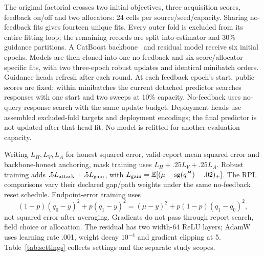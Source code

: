 \documentclass[11pt]{article}
\begin{document}
The original factorial crosses two initial objectives, three acquisition
scores, feedback on/off and two allocators: 24 cells per source/seed/capacity.
Sharing no-feedback fits gives fourteen unique fits. Every outer fold is
excluded from its entire fitting loop; the remaining records are split into
estimator and 30\% guidance partitions. A CatBoost backbone~\cite{catboost}
and residual model receive six initial epochs. Models are then cloned into
one no-feedback and six score/allocator-specific fits, with two three-epoch
robust updates and identical minibatch orders. Guidance heads refresh after
each round. At each feedback epoch's start, public scores are fixed; within
minibatches the current detached predictor searches responses with one start
and two sweeps at 10\% capacity. No-feedback uses no-query response search
with the same update budget. Deployment heads use assembled excluded-fold
targets and deployment encodings; the final predictor is not updated after
that head fit. No model is refitted for another evaluation capacity.

Writing $L_H,L_V,L_A$ for honest squared error, valid-report mean squared
error and backbone-honest anchoring, mask training uses
$L_H+.25L_V+.25L_A$. Robust training adds
$.5L_{\rm attack}+.5L_{\rm gain}$, with
$L_{\rm gain}=\mathbb E[(\mu-\operatorname{sg}(q^H)-.02)_+]$.
The RPL comparisons vary their declared gap/path weights under the same
no-feedback reset schedule. Endpoint-error training uses
\[
 (1-p)(q_0-y)^2+p(q_1-y)^2
 =(\mu-y)^2+p(1-p)(q_1-q_0)^2,
\]
not squared error after averaging. Gradients do not pass through report search,
field choice or allocation. The residual has two width-64 ReLU layers; AdamW
uses learning rate .001, weight decay $10^{-4}$ and gradient clipping at 5.
Table~\ref{tab:settings} collects settings and the separate study scopes.
\end{document}
